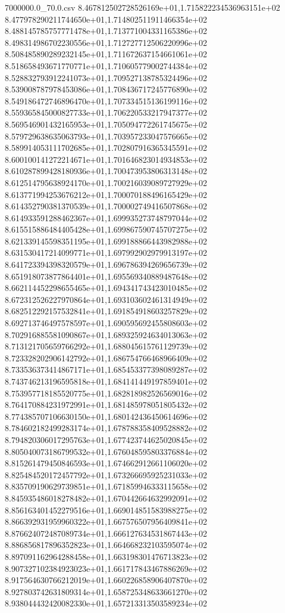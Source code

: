 \begin{filecontents*}{7000000.0_70.0.csv}
8.467812502728526169e+01,1.715822234536963151e+02
8.477978290211744650e+01,1.714802511911466354e+02
8.488145785757771478e+01,1.713771004331165386e+02
8.498314986702230556e+01,1.712727712506220996e+02
8.508485890289232145e+01,1.711672637154661061e+02
8.518658493671770771e+01,1.710605779002744384e+02
8.528832793912241073e+01,1.709527138785324496e+02
8.539008787978453086e+01,1.708436717245776890e+02
8.549186472746896470e+01,1.707334515136199116e+02
8.559365845000827733e+01,1.706220533217947377e+02
8.569546901432165953e+01,1.705094772261745675e+02
8.579729638635063793e+01,1.703957233047576665e+02
8.589914053111702685e+01,1.702807916365345591e+02
8.600100141272214671e+01,1.701646823014934853e+02
8.610287899428180936e+01,1.700473953806313148e+02
8.612514795638924170e+01,1.700216039089727929e+02
8.613771994253676212e+01,1.700070188496165429e+02
8.614352790381370539e+01,1.700002749416507868e+02
8.614933591288462367e+01,1.699935273748797044e+02
8.615515886484405428e+01,1.699867590745707275e+02
8.621339145598351195e+01,1.699188866443982988e+02
8.631530417214099771e+01,1.697992902979913197e+02
8.641723394398320579e+01,1.696786394269656739e+02
8.651918073877864401e+01,1.695569340889487648e+02
8.662114452298655465e+01,1.694341743423010485e+02
8.672312526227970864e+01,1.693103602461314949e+02
8.682512292157532841e+01,1.691854918603257829e+02
8.692713746497578597e+01,1.690595692455808603e+02
8.702916885581090867e+01,1.689325924634013063e+02
8.713121705659766292e+01,1.688045615761129739e+02
8.723328202906142792e+01,1.686754766468966409e+02
8.733536373414867171e+01,1.685453377398089287e+02
8.743746213196595818e+01,1.684141449197859401e+02
8.753957718185520775e+01,1.682818982526569016e+02
8.764170884231972991e+01,1.681485978051805432e+02
8.774385707106630150e+01,1.680142436450614696e+02
8.784602182499283174e+01,1.678788358409528882e+02
8.794820306017295763e+01,1.677423744625020845e+02
8.805040073186799532e+01,1.676048595803376884e+02
8.815261479450846593e+01,1.674662912661106020e+02
8.825484520172457792e+01,1.673266695925231033e+02
8.835709190629739851e+01,1.671859946333115658e+02
8.845935486018278482e+01,1.670442664632992091e+02
8.856163401452279516e+01,1.669014851583988275e+02
8.866392931959960322e+01,1.667576507956409841e+02
8.876624072487089734e+01,1.666127634531867443e+02
8.886856817896352823e+01,1.664668232103595074e+02
8.897091162964288458e+01,1.663198301476713823e+02
8.907327102384923023e+01,1.661717843467886269e+02
8.917564630766212019e+01,1.660226858906407870e+02
8.927803742631809314e+01,1.658725348633661270e+02
8.938044432420082330e+01,1.657213313503589234e+02

\end{filecontents*}
